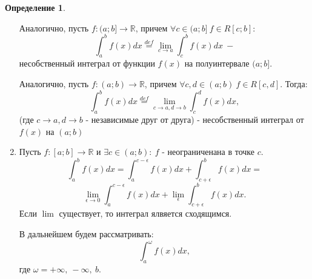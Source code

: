 \documentclass{report}
\theoremstyle{definition}
\newtheorem{definition}{Определение}[section]
\begin{document}
\begin{definition}
\begin{enumerate}
                    Аналогично, пусть $f:(a;b]\rightarrow\mathbb{R}$, причем $\forall c \in (a;b] \ f\in R[c;b]$:
          \begin{equation*}
            \int_{a}^{b}f(x)dx \overset{def}{=} \underset{c\rightarrow a}{\lim}\int_{c}^{b}f(x)dx \ -
          \end{equation*}
          несобственный интеграл от функции $f(x)$ на полуинтервале $(a;b]$.

          Аналогично, пусть $f:(a;b)\rightarrow\mathbb{R}$, причем $\forall c,d \in (a;b) \ f\in R[c,d]$.
          Тогда:
          \begin{equation*}
            \int_{a}^{b}f(x)dx \overset{def}{=} \underset{c\rightarrow a,d\rightarrow b}{\lim}\int_{c}^{d}
            f(x)dx,
          \end{equation*}
          (где $c\rightarrow a,d\rightarrow b$ - независимые друг от друга) - несобственный интеграл от $f(x)$
          на $(a;b)$

    \item Пусть $f:[a;b]\rightarrow\mathbb{R}$ и $\exists c \in (a;b): \ f$ - неограниченана в точке $c$.
          \begin{equation*}
            \int_{a}^{b} f(x) dx = \int_{a}^{c - \epsilon} f(x)dx + \int_{c+\epsilon}^{b}f(x)dx =
          \end{equation*}
          \begin{equation*}
            \underset{\epsilon\rightarrow0}{\lim}\int_{a}^{c - \epsilon} f(x)dx + \underset{\epsilon}{\lim}
            \int_{c+\epsilon}^{b}f(x)dx.
          \end{equation*}
          Если $\lim$ существует, то интеграл ялвяется сходящимся.

          В дальнейшем будем рассматривать:
          \begin{equation*}
            \int_{a}^{\omega}f(x)dx,
          \end{equation*}
          где $\omega = +\infty, \ -\infty, \ b$.
  \end{enumerate}
\end{definition}
\end{document}
